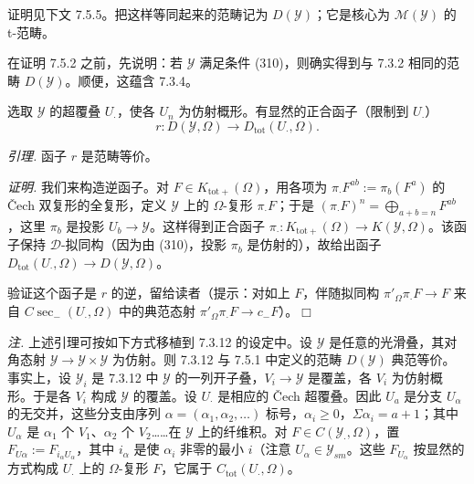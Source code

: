证明见下文 7.5.5。把这样等同起来的范畴记为 $D(\mathcal{Y})$；它是核心为 $\mathcal{M}(\mathcal{Y})$ 的 t-范畴。

在证明 7.5.2 之前，先说明：若 $\mathcal{Y}$ 满足条件 (310)，则确实得到与 7.3.2 相同的范畴 $D(\mathcal{Y})$。顺便，这蕴含 7.3.4。

选取 $\mathcal{Y}$ 的超覆叠 $U_{\cdot}$，使各 $U_{n}$ 为仿射概形。有显然的正合函子（限制到 $U_{\cdot}$）
\begin{equation}\tag{316}
r:D(\mathcal{Y},\Omega)\to D_{\mathrm{tot}}(U_{\cdot},\Omega).
\end{equation}

 \emph{引理.} 函子 $r$ 是范畴等价。

\emph{证明.} 我们来构造逆函子。对 $F\in K_{\mathrm{tot}+}(\Omega)$，用各项为 $\pi_{\cdot}F^{ab}:=\pi_{b}(F^{a})$ 的 Čech 双复形的全复形，定义 $\mathcal{Y}$ 上的 $\Omega$-复形 $\pi_{\cdot}F$；于是 $(\pi_{\cdot}F)^{n}=\bigoplus_{a+b=n}F^{ab}$，这里 $\pi_{b}$ 是投影 $U_{b}\to\mathcal{Y}$。这样得到正合函子 $\pi_{\cdot}:K_{\mathrm{tot}+}(\Omega)\to K(\mathcal{Y},\Omega)$。该函子保持 $\mathcal{D}$-拟同构（因为由 (310)，投影 $\pi_{b}$ 是仿射的），故给出函子 $D_{\mathrm{tot}}(U_{\cdot},\Omega)\to D(\mathcal{Y},\Omega)$。

验证这个函子是 $r$ 的逆，留给读者（提示：对如上 $F$，伴随拟同构 $\pi'_{\Omega}\pi_{\cdot}F\to F$ 来自 $C\sec_{-}(U_{\cdot},\Omega)$ 中的典范态射 $\pi'_{\Omega}\pi_{\cdot}F\to c_{-}F$）。\hfill$\Box$

 \emph{注.} 上述引理可按如下方式移植到 7.3.12 的设定中。设 $\mathcal{Y}$ 是任意的光滑叠，其对角态射 $\mathcal{Y}\to\mathcal{Y}\times\mathcal{Y}$ 为仿射。则 7.3.12 与 7.5.1 中定义的范畴 $D(\mathcal{Y})$ 典范等价。事实上，设 $\mathcal{Y}_{i}$ 是 7.3.12 中 $\mathcal{Y}$ 的一列开子叠，$V_{i}\to\mathcal{Y}$ 是覆盖，各 $V_{i}$ 为仿射概形。于是各 $V_{i}$ 构成 $\mathcal{Y}$ 的覆盖。设 $U_{\cdot}$ 是相应的 Čech 超覆叠。因此 $U_{a}$ 是分支 $U_{\alpha}$ 的无交并，这些分支由序列 $\alpha=(\alpha_{1},\alpha_{2},\ldots)$ 标号，$\alpha_{i}\ge0$，$\Sigma\alpha_{i}=a+1$；其中 $U_{\alpha}$ 是 $\alpha_{1}$ 个 $V_{1}$、$\alpha_{2}$ 个 $V_{2}$……在 $\mathcal{Y}$ 上的纤维积。对 $F\in C(\mathcal{Y}_{\cdot},\Omega)$，置 $F_{U\alpha}:=F_{i_{\alpha}U_{\alpha}}$，其中 $i_{\alpha}$ 是使 $\alpha_{i}$ 非零的最小 $i$（注意 $U_{\alpha}\in\mathcal{Y}_{sm}$。这些 $F_{U_{\alpha}}$ 按显然的方式构成 $U_{\cdot}$ 上的 $\Omega$-复形 $F$，它属于 $C_{\mathrm{tot}}(U_{\cdot},\Omega)$。


